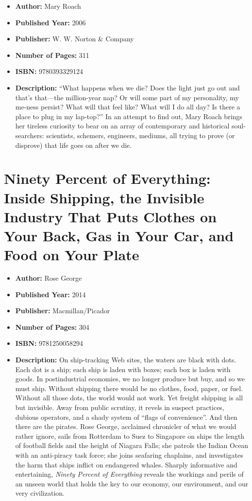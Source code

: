 \documentclass{tufte-handout}
\begin{document}
\begin{itemize}
    \item[] \textbf{Author:} Mary Roach
    \item[] \textbf{Published Year:} 2006
    \item[] \textbf{Publisher:} W. W. Norton \& Company
    \item[] \textbf{Number of Pages:} 311  
    \item[] \textbf{ISBN:} 9780393329124
    \item[] \textbf{Description:} ``What happens when we die? Does the light just go out and that's that—the million-year nap? Or will some part of my personality, my me-ness persist? What will that feel like? What will I do all day? Is there a place to plug in my lap-top?'' In an attempt to find out, Mary Roach brings her tireless curiosity to bear on an array of contemporary and historical soul-searchers: scientists, schemers, engineers, mediums, all trying to prove (or disprove) that life goes on after we die.
\end{itemize}

\section*{Ninety Percent of Everything: Inside Shipping, the Invisible Industry That Puts Clothes on Your Back, Gas in Your Car, and Food on Your Plate}

\begin{itemize}
    \item[] \textbf{Author:} Rose George
    \item[] \textbf{Published Year:} 2014
    \item[] \textbf{Publisher:} Macmillan/Picador
    \item[] \textbf{Number of Pages:} 304  
    \item[] \textbf{ISBN:} 9781250058294
    \item[] \textbf{Description:} On ship-tracking Web sites, the waters are black with dots. Each dot is a ship; each ship is laden with boxes; each box is laden with goods. In postindustrial economies, we no longer produce but buy, and so we must ship. Without shipping there would be no clothes, food, paper, or fuel. Without all those dots, the world would not work. Yet freight shipping is all but invisible. Away from public scrutiny, it revels in suspect practices, dubious operators, and a shady system of ``flags of convenience''. And then there are the pirates. Rose George, acclaimed chronicler of what we would rather ignore, sails from Rotterdam to Suez to Singapore on ships the length of football fields and the height of Niagara Falls; she patrols the Indian Ocean with an anti-piracy task force; she joins seafaring chaplains, and investigates the harm that ships inflict on endangered whales. Sharply informative and entertaining, \textit{Ninety Percent of Everything} reveals the workings and perils of an unseen world that holds the key to our economy, our environment, and our very civilization.
\end{itemize}
\end{document}

